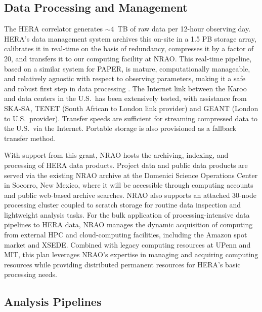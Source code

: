\documentclass[preprint,11pt]{aastex}
\begin{document}
\subsection{Data Processing and Management}
\label{sec:data}
\noindent The HERA correlator generates $\sim4$~TB of raw data per 12-hour observing day.
HERA's data management system archives this on-site in a 1.5 PB storage array, calibrates it in real-time
on the basis of redundancy, compresses it by a factor of 20, and transfers it to our computing facility at NRAO.
This real-time pipeline, based on a similar system for PAPER, is mature, computationally manageable, and 
relatively agnostic with respect to observing parameters, making it a safe and robust first step in data processing
\citep{zheng_et_al2014,parsons_etal2014,ali_et_al2015}.
The Internet link between the Karoo and data centers in the U.S.\ has been extensively tested, with assistance from SKA-SA, TENET
(South African to London link provider) and GEANT (London to U.S.\ provider).   
Transfer speeds are sufficient for streaming compressed data to the U.S.\ via the Internet. Portable storage is also
provisioned as a fallback transfer method.

With support from this grant, NRAO hosts the archiving, indexing, and processing of HERA data products. 
Project data and public data products are served via the existing 
NRAO archive at the Domenici Science Operations Center %
in Socorro, New Mexico, where it will be accessible through computing accounts and public web-based
archive searches.
NRAO also supports
an attached 30-node processing cluster 
coupled to 
scratch storage
for routine data inspection and lightweight analysis tasks.
For the bulk application of processing-intensive data pipelines to HERA data,
NRAO manages the dynamic acquisition of computing from
external HPC and cloud-computing facilities, including the Amazon spot market and XSEDE. 
Combined with legacy computing resources at UPenn and MIT, this plan leverages NRAO's
expertise in managing and acquiring computing resources while providing distributed
permanent resources for HERA's basic processing needs.



\subsection{Analysis Pipelines} 
\label{sec:software}
\end{document}
